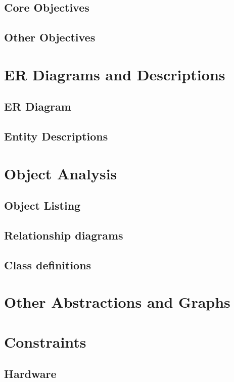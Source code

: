 \subsection{Core Objectives}

\subsection{Other Objectives}

\section{ER Diagrams and Descriptions}

\subsection{ER Diagram}

\subsection{Entity Descriptions}

\section{Object Analysis}

\subsection{Object Listing}

\subsection{Relationship diagrams}

\subsection{Class definitions}

\section{Other Abstractions and Graphs}

\section{Constraints}

\subsection{Hardware}

